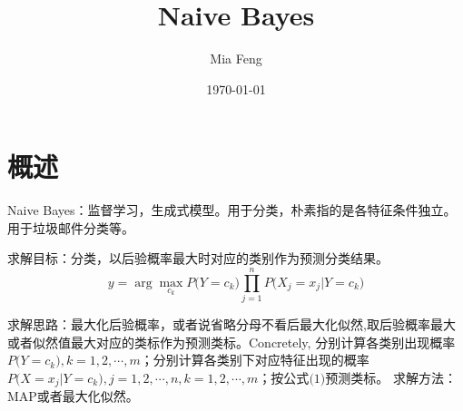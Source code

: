 \documentclass{ctexart}
\title{Naive Bayes} %
\author{Mia Feng} %
\date{\today} %
\begin{document}
\maketitle %




\section{概述}
Naive Bayes：监督学习，生成式模型。用于分类，朴素指的是各特征条件独立\cite{LiHang:Statistic}。用于垃圾邮件分类等。

求解目标：分类，以后验概率最大时对应的类别作为预测分类结果。
\begin{equation}
y=\arg\max\limits_{c_k}P\big(Y=c_k\big)\prod\limits_{j=1}^{n}P\big(X_j=x_j|Y=c_k\big)
\end{equation}

求解思路：最大化后验概率，或者说省略分母不看后最大化似然,取后验概率最大或者似然值最大对应的类标作为预测类标。Concretely, 分别计算各类别出现概率$P\big(Y=c_k\big),k=1,2,\cdots,m$；分别计算各类别下对应特征出现的概率$P\big(X=x_j|Y=c_k\big),j=1,2,\cdots,n,k=1,2,\cdots,m$；按公式$\big(1\big)$预测类标。
求解方法：MAP或者最大化似然。


\end{document}
